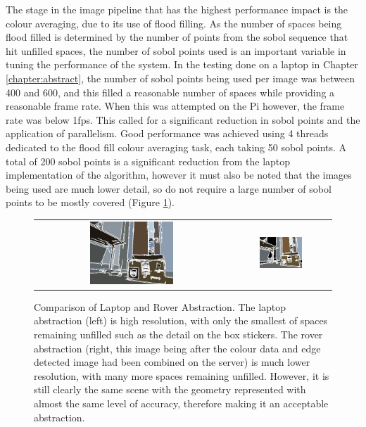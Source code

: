 The stage in the image pipeline that has the highest performance impact is the colour averaging, due to its use of flood filling. As the number of spaces being flood filled is determined by the number of points from the sobol sequence that hit unfilled spaces, the number of sobol points used is an important variable in tuning the performance of the system. In the testing done on a laptop in Chapter \ref{chapter:abstract}, the number of sobol points being used per image was between 400 and 600, and this filled a reasonable number of spaces while providing a reasonable frame rate. When this was attempted on the Pi however, the frame rate was below 1fps. This called for a significant reduction in sobol points and the application of parallelism. Good performance was achieved using 4 threads dedicated to the flood fill colour averaging task, each taking 50 sobol points. A total of 200 sobol points is a significant reduction from the laptop implementation of the algorithm, however it must also be noted that the images being used are much lower detail, so do not require a large number of sobol points to be mostly covered (Figure \ref{fig:LvsR}). 

\begin{figure}[H]
    \begin{center}
    \begin{tabular}{ c c }
        \includegraphics[width=0.45\textwidth]{Figures/abstractcompL.jpg} &
        \includegraphics[width=0.45\textwidth]{Figures/abstractcompR.jpg}
    \end{tabular}
    \caption[Comparison of Laptop and Rover Abstraction]{Comparison of Laptop and Rover Abstraction. The laptop abstraction (left) is high resolution, with only the smallest of spaces remaining unfilled such as the detail on the box stickers. The rover abstraction (right, this image being after the colour data and edge detected image had been combined on the server) is much lower resolution, with many more spaces remaining unfilled. However, it is still clearly the same scene with the geometry represented with almost the same level of accuracy, therefore making it an acceptable abstraction.}
    \label{fig:LvsR}
    \end{center}
\end{figure}

